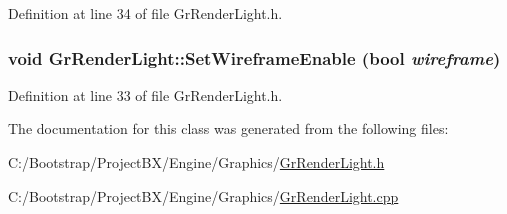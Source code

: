 Definition at line 34 of file GrRenderLight.h.\hypertarget{class_gr_render_light_54d51afb9a0c33cb1ada63e4965df88f}{
\subsubsection[{SetWireframeEnable}]{\setlength{\rightskip}{0pt plus 5cm}void GrRenderLight::SetWireframeEnable (bool {\em wireframe})}}
\label{class_gr_render_light_54d51afb9a0c33cb1ada63e4965df88f}




Definition at line 33 of file GrRenderLight.h.

The documentation for this class was generated from the following files:\begin{CompactItemize}
\item 
C:/Bootstrap/ProjectBX/Engine/Graphics/\hyperlink{_gr_render_light_8h}{GrRenderLight.h}\item 
C:/Bootstrap/ProjectBX/Engine/Graphics/\hyperlink{_gr_render_light_8cpp}{GrRenderLight.cpp}\end{CompactItemize}
